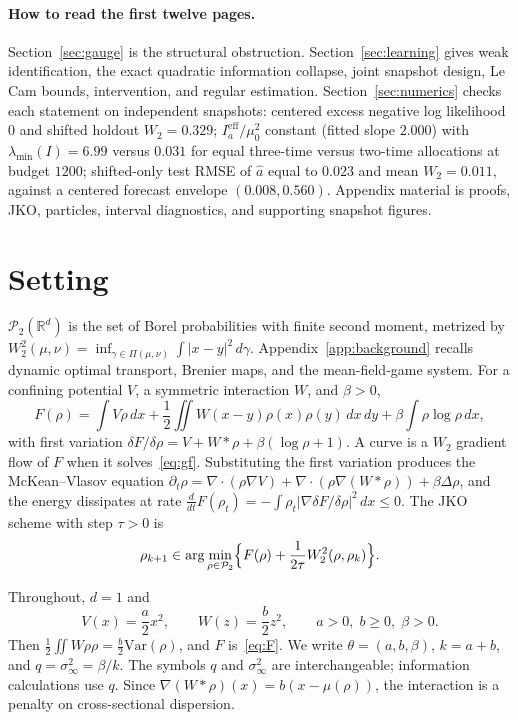 \documentclass[anon,11pt]{alt2027}
\newcommand{\R}{\mathbb{R}}
\newcommand{\Ptwo}{\mathcal{P}_2}
\newcommand{\Wtwo}{W_2}
\newcommand{\Var}{\mathrm{Var}}
\begin{document}
\paragraph{How to read the first twelve pages.}
Section~\ref{sec:gauge} is the structural obstruction.
Section~\ref{sec:learning} gives weak identification, the exact quadratic
information collapse, joint snapshot design, Le Cam bounds, intervention, and
regular estimation. Section~\ref{sec:numerics} checks each statement on
independent snapshots: centered excess negative log likelihood $0$ and shifted
holdout $W_2=0.329$; $I_a^{\mathrm{eff}}/\mu_0^2$ constant (fitted slope
$2.000$) with $\lambda_{\min}(I)=6.99$ versus $0.031$ for equal three-time
versus two-time allocations at budget $1200$; shifted-only test RMSE of
$\hat a$ equal to $0.023$ and mean $W_2=0.011$, against a centered forecast
envelope $(0.008,0.560)$. Appendix material is proofs, JKO, particles,
interval diagnostics, and supporting snapshot figures.

\section{Setting}
\label{sec:setting}

$\Ptwo(\R^d)$ is the set of Borel probabilities with finite second moment,
metrized by
$\Wtwo^2(\mu,\nu)=\inf_{\gamma\in\Pi(\mu,\nu)}\int|x-y|^2\,d\gamma$.
Appendix~\ref{app:background} recalls dynamic optimal transport, Brenier maps,
and the mean-field-game system. For a confining potential $V$, a symmetric
interaction $W$, and $\beta>0$,
\begin{equation}
\label{eq:F-general}
F(\rho)
=
\int V\rho\,dx
+
\frac12\iint W(x-y)\rho(x)\rho(y)\,dx\,dy
+
\beta\int\rho\log\rho\,dx,
\end{equation}
with first variation
$\delta F/\delta\rho=V+W\ast\rho+\beta(\log\rho+1)$.
A curve is a $W_2$ gradient flow of $F$ when it solves~\eqref{eq:gf}.
Substituting the first variation produces the McKean--Vlasov equation
$\partial_t\rho=\nabla\cdot(\rho\nabla V)+\nabla\cdot(\rho\nabla(W\ast\rho))+\beta\Delta\rho$,
and the energy dissipates at rate
$\frac{d}{dt}F(\rho_t)=-\int\rho_t\bigl|\nabla\delta F/\delta\rho\bigr|^2\,dx\le 0$.
The JKO scheme with step $\tau>0$ is
\begin{equation}
\label{eq:jko}
\rho_{k+1}
\in
\arg\min_{\rho\in\Ptwo}
\Bigl\{
F(\rho)+\frac1{2\tau}\Wtwo^2(\rho,\rho_k)
\Bigr\}.
\end{equation}

Throughout, $d=1$ and
\begin{equation}
\label{eq:quad}
V(x)=\frac a2 x^2,
\qquad
W(z)=\frac b2 z^2,
\qquad
a>0,\; b\ge 0,\; \beta>0.
\end{equation}
Then $\frac12\iint W\rho\rho=\frac b2\Var(\rho)$, and $F$ is~\eqref{eq:F}.
We write $\theta=(a,b,\beta)$, $k=a+b$, and
$q=\sigma_\infty^2=\beta/k$. The symbols $q$ and $\sigma_\infty^2$ are
interchangeable; information calculations use $q$.
Since $\nabla(W\ast\rho)(x)=b(x-\mu(\rho))$, the interaction is a penalty on
cross-sectional dispersion.
\end{document}

